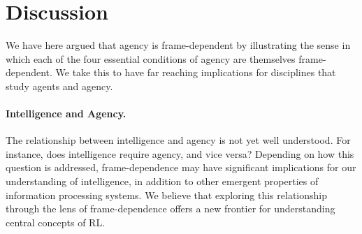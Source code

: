 \documentclass[11pt]{article} %
\begin{document}
%


%


\section{Discussion}


%
We have here argued that agency is frame-dependent by illustrating the sense in which each of the four essential conditions of agency are themselves frame-dependent. We take this to have far reaching implications for disciplines that study agents and agency. 


%
\paragraph{Intelligence and Agency.} The relationship between intelligence and agency is not yet well understood. For instance, does intelligence require agency, and vice versa? Depending on how this question is addressed, frame-dependence may have significant implications for our understanding of intelligence, in addition to other emergent properties of information processing systems. We believe that exploring this relationship through the lens of frame-dependence offers a new frontier for understanding central concepts of RL. 
\end{document}
